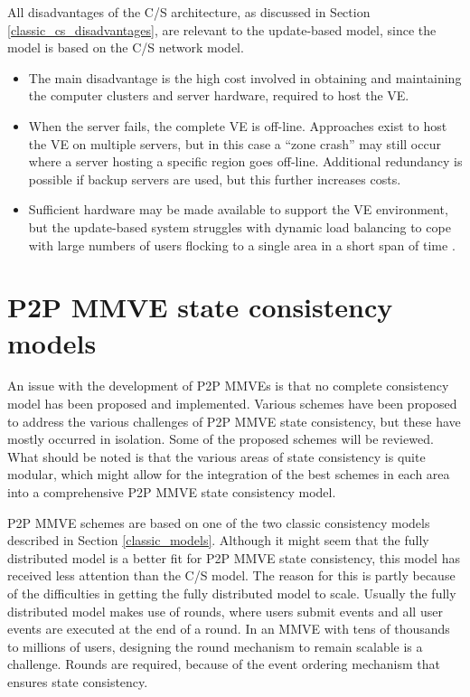 All disadvantages of the C/S architecture, as discussed in Section \ref{classic_cs_disadvantages}, are relevant to the update-based model, since the model is based on the C/S network model.
%
\begin{itemize}
\item The main disadvantage is the high cost involved in obtaining and maintaining the computer clusters and server hardware, required to host the VE.

\item When the server fails, the complete VE is off-line. Approaches exist to host the VE on multiple servers, but in this case a ``zone crash'' may still occur where a server hosting a specific region goes off-line. Additional redundancy is possible if backup servers are used, but this further increases costs.

\item Sufficient hardware may be made available to support the VE environment, but the update-based system struggles with dynamic load balancing to cope with large numbers of users flocking to a single area in a short span of time \cite{flocking}.
\end{itemize}

\section{P2P MMVE state consistency models}
\label{p2p_mmve_state_consistency}

An issue with the development of P2P MMVEs is that no complete consistency model has been proposed and implemented. Various schemes have been proposed to address the various challenges of P2P MMVE state consistency, but these have mostly occurred in isolation. Some of the proposed schemes will be reviewed. What should be noted is that the various areas of state consistency is quite modular, which might allow for the integration of the best schemes in each area into a comprehensive P2P MMVE state consistency model.

P2P MMVE schemes are based on one of the two classic consistency models described in Section \ref{classic_models}. Although it might seem that the fully distributed model is a better fit for P2P MMVE state consistency, this model has received less attention than the C/S model. The reason for this is partly because of the difficulties in getting the fully distributed model to scale. Usually the fully distributed model makes use of rounds, where users submit events and all user events are executed at the end of a round. In an MMVE with tens of thousands to millions of users, designing the round mechanism to remain scalable is a challenge. Rounds are required, because of the event ordering mechanism that ensures state consistency.

